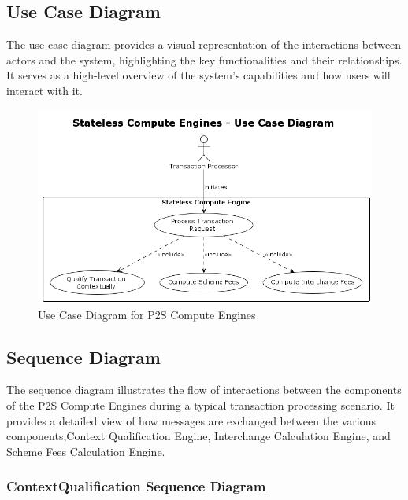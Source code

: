 \subsection{Use Case Diagram}
The use case diagram provides a visual representation of the interactions between actors and the system, highlighting the key functionalities and their relationships. It serves as a high-level overview of the system's capabilities and how users will interact with it.




\begin{figure}[H]
    \centering
    \includegraphics[width=1.05\textwidth]{out/diagrams/plantuml/in/use-case/use-case.png}
    \caption{Use Case Diagram for P2S Compute Engines}
    \label{fig:use_case_diagram}
\end{figure}



\subsection{Sequence Diagram}
The sequence diagram illustrates the flow of interactions between the components of the P2S Compute Engines during a typical transaction processing scenario. It provides a detailed view of how messages are exchanged between the various components,Context Qualification Engine, Interchange Calculation Engine, and Scheme Fees Calculation Engine.

\subsubsection{ContextQualification Sequence Diagram}



